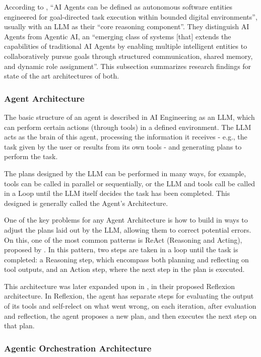 \documentclass[a4paper]{report}
\begin{document}
According to \cite{sapkota2025aiagentsvsagentic}, ``AI Agents can be defined as autonomous software entities engineered for goal-directed task execution within bounded digital environments'', usually with an LLM as their ``core reasoning component''. They distinguish AI Agents from Agentic AI, an ``emerging class of systems [that] extends the capabilities of traditional AI Agents by enabling multiple intelligent entities to collaboratively pursue goals through structured communication, shared memory, and dynamic role assignment''. This subsection summarizes research findings for state of the art architectures of both.

\subsubsection{Agent Architecture}

The basic structure of an agent is described in AI Engineering as an LLM, which can perform certain actions (through tools) in a defined environment. The LLM acts as the brain of this agent, processing the information it receives - e.g., the task given by the user or results from its own tools - and generating plans to perform the task.

The plans designed by the LLM can be performed in many ways, for example, tools can be called in parallel or sequentially, or the LLM and tools call be called in a Loop until the LLM itself decides the task has been completed. This designed is generally called the Agent's Architecture.

One of the key problems for any Agent Architecture is how to build in ways to adjust the plans laid out by the LLM, allowing them to correct potential errors. On this, one of the most common patterns is ReAct (Reasoning and Acting), proposed by \cite{yao2023react}. In this pattern, two steps are taken in a loop until the task is completed: a Reasoning step, which encompass both planning and reflecting on tool outputs, and an Action step, where the next step in the plan is executed.

This architecture was later expanded upon in \cite{shinn2023reflexion}, in their proposed Reflexion architecture. In Reflexion, the agent has separate steps for evaluating the output of its tools and self-relect on what went wrong, on each iteration, after evaluation and reflection, the agent proposes a new plan, and then executes the next step on that plan.

\subsubsection{Agentic Orchestration Architecture}
\end{document}
